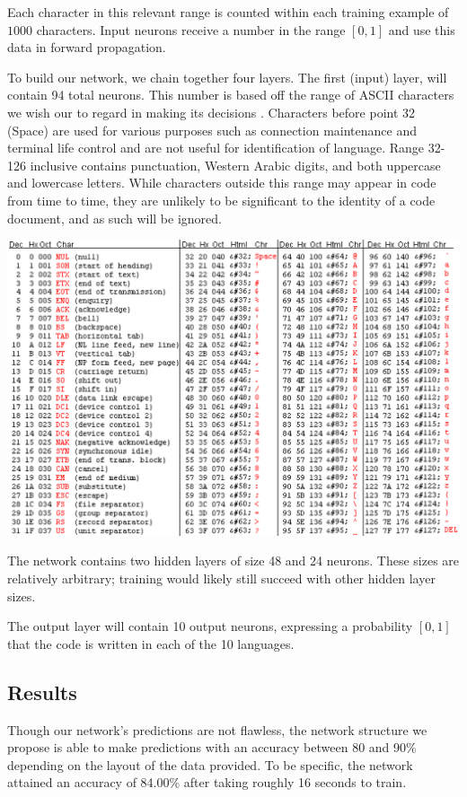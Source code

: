 \documentclass{article}
\begin{document}
Each character in this relevant range is counted within each training example of $1000$ characters. Input neurons receive a number in the range $[0,1]$ and use this data in forward propagation.

To build our network, we chain together four layers. The first (input) layer, will contain 94 total neurons. This number is based off the range of ASCII characters we wish our to regard in making its decisions \cite{asciitable}. Characters before point 32 (Space) are used for various purposes such as connection maintenance and terminal life control and are not useful for identification of language. Range 32-126 inclusive contains punctuation, Western Arabic digits, and both uppercase and lowercase letters. While characters outside this range may appear in code from time to time, they are unlikely to be significant to the identity of a code document, and as such will be ignored.

\begin{center}
    \includegraphics{asciitable}
\end{center}

The network contains two hidden layers of size 48 and 24 neurons. These sizes are relatively arbitrary; training would likely still succeed with other hidden layer sizes.

The output layer will contain 10 output neurons, expressing a probability $[0,1]$ that the code is written in each of the 10 languages.

\subsection{Results}
Though our network's predictions are not flawless, the network structure we propose is able to make predictions with an accuracy between 80 and 90\% depending on the layout of the data provided. To be specific, the network attained an accuracy of 84.00\% after taking roughly 16 seconds to train.
\end{document}
